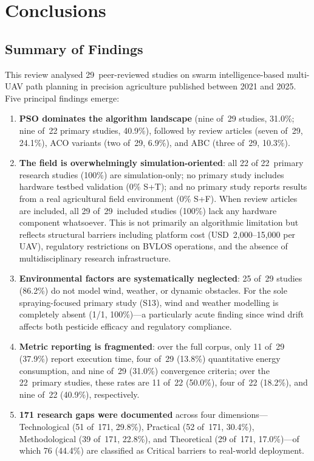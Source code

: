 \documentclass[review,3p]{elsarticle}
\begin{document}
\section{Conclusions}

\subsection{Summary of Findings}
\label{subsec:summary_findings}

This review analysed 29~peer-reviewed studies on swarm intelligence-based
multi-UAV path planning in precision agriculture published between 2021 and
2025. Five principal findings emerge:

\begin{enumerate}
  \item \textbf{PSO dominates the algorithm landscape} (nine of~29 studies,
  31.0\%; nine of~22 primary studies, 40.9\%), followed by review articles
  (seven of~29, 24.1\%), ACO variants (two of~29, 6.9\%), and ABC (three of~29, 10.3\%).

  \item \textbf{The field is overwhelmingly simulation-oriented}: all 22 of
  22~primary research studies (100\%) are simulation-only; no primary study
  includes hardware testbed validation (0\% S+T); and no primary study reports
  results from a real agricultural field environment (0\% S+F). When review
  articles are included, all 29 of~29~included studies (100\%) lack any hardware
  component whatsoever. This is not primarily an algorithmic limitation but
  reflects structural barriers including platform cost (USD~2,000--15,000 per
  UAV), regulatory restrictions on BVLOS operations, and the absence of
  multidisciplinary research infrastructure.

  \item \textbf{Environmental factors are systematically neglected}: 25 of~29
  studies (86.2\%) do not model wind, weather, or dynamic obstacles. For the
  sole spraying-focused primary study (S13), wind and weather modelling is
  completely absent (1/1, 100\%)---a particularly acute finding since wind drift
  affects both pesticide efficacy and regulatory compliance.

  \item \textbf{Metric reporting is fragmented}: over the full corpus,
  only 11 of~29 (37.9\%) report execution time, four of~29 (13.8\%) quantitative
  energy consumption, and nine of~29 (31.0\%) convergence criteria; over the
  22~primary studies, these rates are 11 of~22 (50.0\%), four of~22 (18.2\%),
  and nine of~22 (40.9\%), respectively.

  \item \textbf{171 research gaps were documented} across four dimensions---Technological
  (51 of~171, 29.8\%), Practical (52 of~171, 30.4\%), Methodological (39 of~171,
  22.8\%), and Theoretical (29 of~171, 17.0\%)---of which 76 (44.4\%) are
  classified as Critical barriers to real-world deployment.
\end{enumerate}
\end{document}
